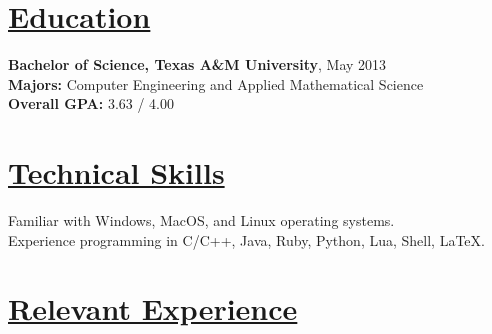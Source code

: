 \documentclass[8pt]{res}
\begin{document}
 

  \address{\bf \underline{Contact Info}\\juanlb1988@gmail.com\\(254)-449-6995}

  \begin{resume}


    \section{\underline{Education}}          
    \textbf{Bachelor of Science, Texas A\&M University}, May 2013   \\       
    \textbf{Majors:} Computer Engineering and Applied Mathematical Science \\
    \textbf{Overall GPA:} 3.63 / 4.00     


    \section{\underline{Technical Skills}}        
    Familiar with Windows, MacOS, and Linux operating systems. \\
    Experience programming in C/C++, Java, Ruby, Python, Lua, Shell, \LaTeX.


    \section{\underline{Relevant Experience}}
    \vspace{-0.08in}	


\end{resume}
\end{document}
